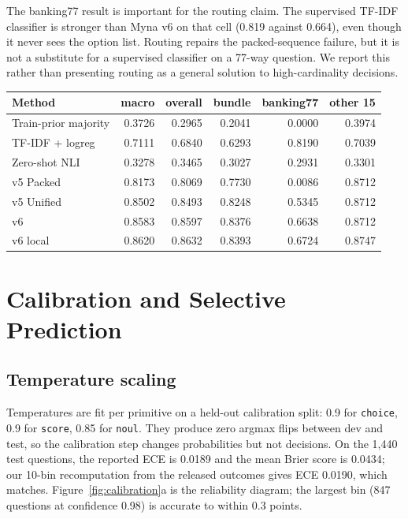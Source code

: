 The banking77 result is important for the routing claim. The supervised TF-IDF classifier is stronger than Myna v6 on that cell (0.819 against 0.664), even though it never sees the option list. Routing repairs the packed-sequence failure, but it is not a substitute for a supervised classifier on a 77-way question. We report this rather than presenting routing as a general solution to high-cardinality decisions.

\begin{widetable}
\centering
\footnotesize
\caption{External baselines and Myna arms on the same 1{,}176 test bundles. Majority and TF-IDF are trained on the suite's train split; NLI is zero-shot. Myna v6 is fine-tuned in-domain. Bundle exact is the fraction of bundles in which every question is correct. The v6 local row is a re-score of the same checkpoint, not a separate model.}
\label{tab:routing}
\begin{tabular}{lrrrrr}
\toprule
Method & macro & overall & bundle & banking77 & other 15 \\
\midrule
Train-prior majority & 0.3726 & 0.2965 & 0.2041 & 0.0000 & 0.3974 \\
TF-IDF + logreg & 0.7111 & 0.6840 & 0.6293 & 0.8190 & 0.7039 \\
Zero-shot NLI & 0.3278 & 0.3465 & 0.3027 & 0.2931 & 0.3301 \\
\midrule
v5 Packed & 0.8173 & 0.8069 & 0.7730 & 0.0086 & 0.8712 \\
v5 Unified & 0.8502 & 0.8493 & 0.8248 & 0.5345 & 0.8712 \\
v6 & 0.8583 & 0.8597 & 0.8376 & 0.6638 & 0.8712 \\
v6 local & 0.8620 & 0.8632 & 0.8393 & 0.6724 & 0.8747 \\
\bottomrule
\end{tabular}
\end{widetable}


\section{Calibration and Selective Prediction}
\label{sec:calibration}

\subsection{Temperature scaling}
Temperatures are fit per primitive on a held-out calibration split: 0.9 for \texttt{choice}, 0.9 for \texttt{score}, 0.85 for \texttt{noul}. They produce zero argmax flips between dev and test, so the calibration step changes probabilities but not decisions. On the 1{,}440 test questions, the reported ECE is 0.0189 and the mean Brier score is 0.0434; our 10-bin recomputation from the released outcomes gives ECE 0.0190, which matches. Figure~\ref{fig:calibration}a is the reliability diagram; the largest bin (847 questions at confidence 0.98) is accurate to within 0.3 points.

